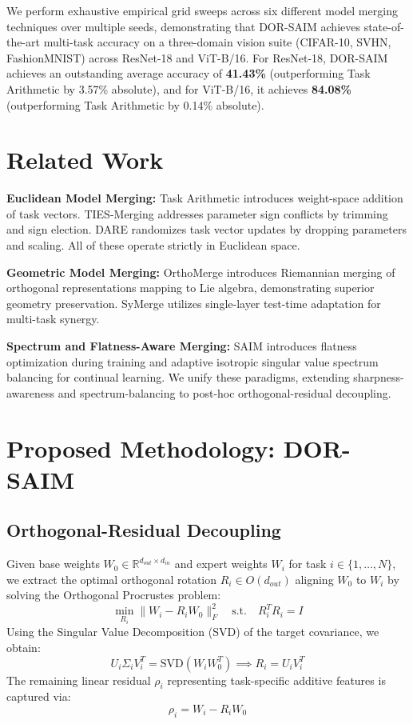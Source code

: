 \documentclass{article}
\begin{document}
We perform exhaustive empirical grid sweeps across six different model merging techniques over multiple seeds, demonstrating that DOR-SAIM achieves state-of-the-art multi-task accuracy on a three-domain vision suite (CIFAR-10, SVHN, FashionMNIST) across ResNet-18 and ViT-B/16. For ResNet-18, DOR-SAIM achieves an outstanding average accuracy of \textbf{41.43\%} (outperforming Task Arithmetic by 3.57\% absolute), and for ViT-B/16, it achieves \textbf{84.08\%} (outperforming Task Arithmetic by 0.14\% absolute).

\section{Related Work}
\label{sec:related}
\textbf{Euclidean Model Merging:} Task Arithmetic \cite{ilharco2022editing} introduces weight-space addition of task vectors. TIES-Merging \cite{yadav2023ties} addresses parameter sign conflicts by trimming and sign election. DARE \cite{yu2024dare} randomizes task vector updates by dropping parameters and scaling. All of these operate strictly in Euclidean space.

\textbf{Geometric Model Merging:} OrthoMerge \cite{yang2026ortho} introduces Riemannian merging of orthogonal representations mapping to Lie algebra, demonstrating superior geometry preservation. SyMerge \cite{jung2026symerge} utilizes single-layer test-time adaptation for multi-task synergy.

\textbf{Spectrum and Flatness-Aware Merging:} SAIM \cite{saim2026} introduces flatness optimization during training and adaptive isotropic singular value spectrum balancing for continual learning. We unify these paradigms, extending sharpness-awareness and spectrum-balancing to post-hoc orthogonal-residual decoupling.

\section{Proposed Methodology: DOR-SAIM}
\label{sec:method}

\subsection{Orthogonal-Residual Decoupling}
Given base weights $W_0 \in \mathbb{R}^{d_{out} \times d_{in}}$ and expert weights $W_i$ for task $i \in \{1, \dots, N\}$, we extract the optimal orthogonal rotation $R_i \in O(d_{out})$ aligning $W_0$ to $W_i$ by solving the Orthogonal Procrustes problem:
\begin{equation}
\min_{R_i} \|W_i - R_i W_0\|_F^2 \quad \text{s.t.} \quad R_i^T R_i = I
\end{equation}
Using the Singular Value Decomposition (SVD) of the target covariance, we obtain:
\begin{equation}
U_i \Sigma_i V_i^T = \text{SVD}(W_i W_0^T) \implies R_i = U_i V_i^T
\end{equation}
The remaining linear residual $\rho_i$ representing task-specific additive features is captured via:
\begin{equation}
\rho_i = W_i - R_i W_0
\end{equation}
\end{document}
